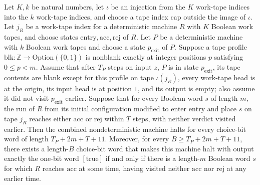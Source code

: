 \begin{theorem}
\label{Turing.guessRunTM_silent_spec}
\leanok
{}
Let $K,k$ be natural numbers, let $\iota$ be an injection from the $K$ work-tape indices
into the $k$ work-tape indices, and choose a tape index $\mathrm{cap}$ outside the image
of $\iota$. Let $j_R$ be a work-tape index for a deterministic machine $R$ with $K$
Boolean work tapes, and choose states $\mathrm{entry},\mathrm{acc},\mathrm{rej}$ of $R$.
Let $P$ be a deterministic machine with $k$ Boolean work tapes and choose a state
$p_{\mathrm{exit}}$ of $P$. Suppose a tape profile $\mathrm{blk}:\mathbb
Z\to\mathrm{Option}(\{0,1\})$ is nonblank exactly at integer positions $p$ satisfying
$0\le p<m$. Assume that after $T_P$ steps on input $z$, $P$ is in state
$p_{\mathrm{exit}}$, its tape contents are blank except for this profile on tape
$\iota(j_R)$, every work-tape head is at the origin, its input head is at position $1$,
and its output is empty; also assume it did not visit $p_{\mathrm{exit}}$ earlier.
Suppose that for every Boolean word $s$ of length $m$, the run of $R$ from its initial
configuration modified to enter $\mathrm{entry}$ and place $s$ on tape $j_R$ reaches
either $\mathrm{acc}$ or $\mathrm{rej}$ within $T$ steps, with neither verdict visited
earlier. Then the combined nondeterministic machine halts for every choice-bit word of
length $T_P+2m+T+11$. Moreover, for every $B\ge T_P+2m+T+11$, there exists a length-$B$
choice-bit word that makes this machine halt with output exactly the one-bit word
$[\mathrm{true}]$ if and only if there is a length-$m$ Boolean word $s$ for which $R$
reaches $\mathrm{acc}$ at some time, having visited neither $\mathrm{acc}$ nor
$\mathrm{rej}$ at any earlier time.
\end{theorem}
